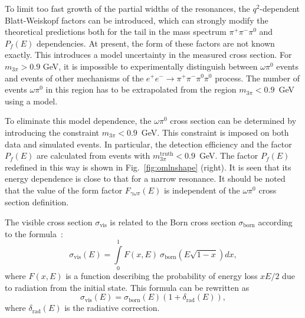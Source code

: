 \documentclass[twocolumn,aps,prd,floatfix,nofootinbib,superscriptaddress]{revtex4-2}
\begin{document}
To limit too fast growth of the partial widths of the resonances, the $q^2$-dependent Blatt-Weiskopf factors can be introduced, which can strongly modify the theoretical predictions both for the tail in the mass spectrum $\pi^+\pi^-\pi^0$ and $P_f(E)$ dependencies.
At present, the form of these factors are not known exactly.
This introduces a model uncertainty in the measured cross section.
For \( m_{3\pi} > 0.9 \) GeV, it is impossible to experimentally distinguish between $\omega\pi^0$ events and events of other mechanisms of the \( e^+e^- \to \pi^+\pi^-\pi^0\pi^0 \) process.
The number of events $\omega\pi^0$ in this region has to be extrapolated from the region \( m_{3\pi} < 0.9 \)~GeV using a model.

To eliminate this model dependence, the $\omega\pi^0$ cross section can be determined by introducing the constraint \( m_{3\pi} < 0.9 \)~GeV.
This constraint is imposed on both data and simulated events.
In particular, the detection efficiency and the factor $P_f(E)$ are calculated from events with \( m_{3\pi}^\text{truth} < 0.9 \)~GeV.
The factor $P_f(E)$ redefined in this way is shown in Fig.~\ref{fig:omlnshape} (right).
It is seen that its energy dependence is close to that for a narrow resonance.
It should be noted that the value of the form factor $F_{\gamma\omega\pi}(E)$ is independent of the $\omega\pi^0$ cross section definition.

The visible cross section $\sigma_\text{vis}$ is related to the Born cross section $\sigma_\text{born}$ according to the formula~\cite{kuraev}:
\begin{equation}
\label{eq:radcor}
	\sigma_\text{vis}(E) = \int\limits^1_0 F(x,E)\ \sigma_\text{born} \left( E \sqrt{1-x} \right) dx,
\end{equation}
where $F(x,E)$ is a function describing the probability of energy loss $xE/2$ due to radiation from the initial state.
This formula can be rewritten as
\begin{equation}
\label{eq:radcor1}
	\sigma_\text{vis}(E) = \sigma_\text{born}(E)(1+\delta_\text{rad}(E)),
\end{equation}
where $\delta_\text{rad}(E)$ is the radiative correction.
\end{document}
